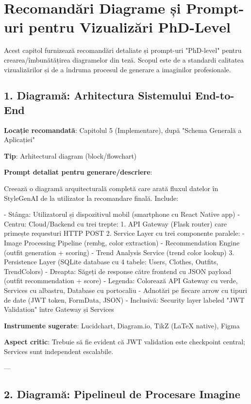 \appendix
\chapter{Recomandări Diagrame și Prompt-uri pentru Vizualizări PhD-Level}
\label{cap:diagrame_recomandari}

Acest capitol furnizează recomandări detaliate și prompt-uri "PhD-level" pentru crearea/îmbunătățirea diagramelor din teză. Scopul este de a standardi calitatea vizualizărilor și de a îndruma procesul de generare a imaginilor profesionale.

\section{1. Diagramă: Arhitectura Sistemului End-to-End}

\textbf{Locație recomandată}: Capitolul 5 (Implementare), după "Schema Generală a Aplicației"

\textbf{Tip}: Arhitectural diagram (block/flowchart)

\textbf{Prompt detaliat pentru generare/descriere}:

Creează o diagramă arquitecturală completă care arată fluxul datelor în StyleGenAI de la utilizator la recomandare finală. Include:

- Stânga: Utilizatorul și dispozitivul mobil (smartphone cu React Native app)
- Centru: Cloud/Backend cu trei trepte:
  1. API Gateway (Flask router) care primește requesturi HTTP POST
  2. Service Layer cu trei componente paralele:
     - Image Processing Pipeline (rembg, color extraction)
     - Recommendation Engine (outfit generation + scoring)
     - Trend Analysis Service (trend color lookup)
  3. Persistence Layer (SQLite database cu 4 tabele: Users, Clothes, Outfits, TrendColors)
- Dreapta: Săgeți de response către frontend cu JSON payload (outfit recommendation + score)
- Legenda: Colorează API Gateway cu verde, Services cu albastru, Database cu portocaliu
- Adnotări pe fiecare arrow cu tipuri de date (JWT token, FormData, JSON)
- Inclusivă: Security layer labeled "JWT Validation" între Gateway și Services

\textbf{Instrumente sugerate}: Lucidchart, Diagram.io, TikZ (LaTeX native), Figma

\textbf{Aspect critic}: Trebuie să fie evident că JWT validation este checkpoint central; Services sunt independent escalabile.

---

\section{2. Diagramă: Pipelineul de Procesare Imagine}

